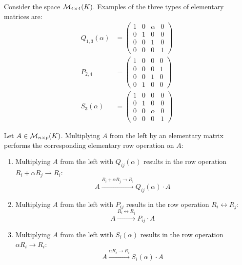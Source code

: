 \begin{example}
Consider the space $\mathcal{M}_{4 \times 4}(K)$. Examples of the three types of elementary matrices are:
\begin{align*}
    Q_{1,3}(\alpha) &= \begin{pmatrix} 1 & 0 & \alpha & 0 \\ 0 & 1 & 0 & 0 \\ 0 & 0 & 1 & 0 \\ 0 & 0 & 0 & 1 \end{pmatrix} \\
    P_{2,4} &= \begin{pmatrix} 1 & 0 & 0 & 0 \\ 0 & 0 & 0 & 1 \\ 0 & 0 & 1 & 0 \\ 0 & 1 & 0 & 0 \end{pmatrix} \\
    S_3(\alpha) &= \begin{pmatrix} 1 & 0 & 0 & 0 \\ 0 & 1 & 0 & 0 \\ 0 & 0 & \alpha & 0 \\ 0 & 0 & 0 & 1 \end{pmatrix}
\end{align*}
\end{example}

\begin{lemma}
\label{lemma:row_operations_matrix_multiplication}
Let $A \in \mathcal{M}_{n \times p}(K)$. Multiplying $A$ from the left by an elementary matrix performs the corresponding elementary row operation on $A$:
\begin{enumerate}
    \item Multiplying $A$ from the left with $Q_{ij}(\alpha)$ results in the row operation $R_i + \alpha R_j \longrightarrow R_i$:
    \begin{equation*}
        A \xrightarrow{R_i + \alpha R_j \longrightarrow R_i} Q_{ij}(\alpha) \cdot A
    \end{equation*}
    \item Multiplying $A$ from the left with $P_{ij}$ results in the row operation $R_i \leftrightarrow R_j$:
    \begin{equation*}
        A \xrightarrow{R_i \leftrightarrow R_j} P_{ij} \cdot A
    \end{equation*}
    \item Multiplying $A$ from the left with $S_i(\alpha)$ results in the row operation $\alpha R_i \longrightarrow R_i$:
    \begin{equation*}
        A \xrightarrow{\alpha R_i \longrightarrow R_i} S_i(\alpha) \cdot A
    \end{equation*}
\end{enumerate}
\end{lemma}

